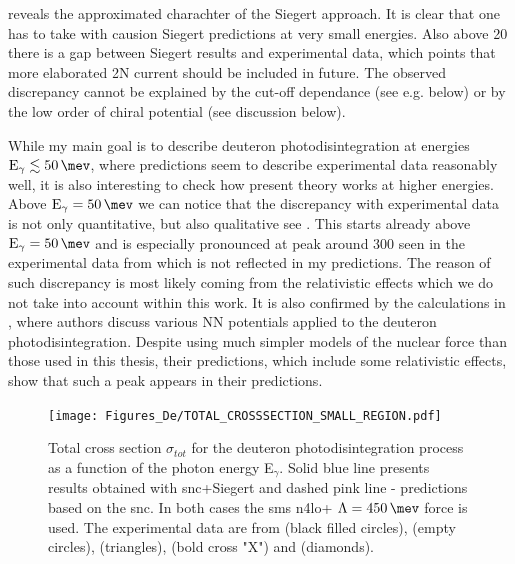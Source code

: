      reveals the approximated charachter of the Siegert approach.
    It is clear that one has to take with causion Siegert predictions at very small energies.
    Also above \SI{20}{\mev} there is a gap between Siegert results and experimental data,
    which points that more elaborated 2N current should be included in future.
    The observed discrepancy cannot be explained by the cut-off dependance
    (see e.g.  below) or by the low order of chiral potential (see discussion below).

    While my main goal is to describe deuteron photodisintegration
    at energies $\text{E}_\gamma \lesssim \SI{50}{\mev}$, 
    where predictions seem to describe experimental data reasonably well,
    it is also interesting to check how 
    present theory works at higher energies.
    Above $\text{E}_\gamma=\SI{50}{\mev}$
    we can notice that the discrepancy with experimental data is not only 
    quantitative, but also qualitative see .  
    This starts already above $\text{E}_\gamma=\SI{50}{\mev}$ and is especially pronounced at peak around \SI{300}{\mev}
    seen in the experimental data from \cite{Bernabei1986} which is not
    reflected in my predictions. The reason of such discrepancy 
    is most likely coming from the relativistic effects
    which we do not take into account within this work.
    It is also confirmed by the calculations in \cite{ArenhovelPhotodisint1991},
    where authors discuss various NN potentials applied to the deuteron photodisintegration.
    Despite using much simpler models of the nuclear force than those used in this thesis,
    their predictions, which include some relativistic effects, show that such a peak appears in their predictions. 
    
    
    
    \begin{figure}[h]
        \begin{center}
        \texttt{[image: Figures\_De/TOTAL\_CROSSSECTION\_SMALL\_REGION.pdf]}
        \end{center}
        \caption{Total cross section $\sigma_{tot}$ for the deuteron photodisintegration process
        as a function of the photon energy E$_\gamma$.
        Solid blue line presents results obtained with \gls{snc}+Siegert 
        and dashed pink line - predictions based on the \gls{snc}.
        In both cases the \gls{sms} \gls{n4lo+} $\Lambda=\SI{450}{\mev}$ force is used.
        The experimental data are from \cite{Bernabei1986} (black filled circles),
        \cite{BOSMAN1979} (empty circles),
        \cite{Skopik1974} (triangles),
        \cite{Moreh1989} (bold cross "X") and
        \cite{Birenbaum1985} (diamonds).
        }
        \label{TOTAL_CROSS_small}
    \end{figure}

